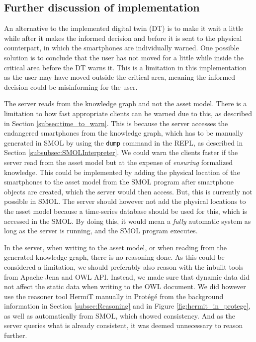 \documentclass{article}
\begin{document}
\subsection{Further discussion of implementation}
An alternative to the implemented digital twin (DT) is to make it wait a little while after it makes the informed decision and before it is sent to the physical counterpart, in which the smartphones are individually warned. One possible solution is to conclude that the user has not moved for a little while inside the critical area before the DT warns it. This is a limitation in this implementation as the user may have moved outside the critical area, meaning the informed decision could be misinforming for the user.

The server reads from the knowledge graph and not the asset model.
There is a limitation to how fast appropriate clients can be warned due to this, as described in Section \ref{subsec:time_to_warn}. This is because the server accesses the endangered smartphones from the knowledge graph, which has to be manually generated in SMOL by using the \verb|dump| command in the REPL, as described in Section \ref{subsubsec:SMOLInterpreter}. We could warn the clients faster if the server read from the asset model but at the expense of \emph{ensuring} formalized knowledge. This could be implemented by adding the physical location of the smartphones to the asset model from the SMOL program after smartphone objects are created, which the server would then access. But, this is currently not possible in SMOL. The server should however not add the physical locations to the asset model because a time-series database should be used for this, which is accessed in the SMOL. By doing this, it would mean a \emph{fully} automatic system as long as the server is running, and the SMOL program executes.

In the server, when writing to the asset model, or when reading from the generated knowledge graph, there is no reasoning done. As this could be considered a limitation, we should preferably also reason with the inbuilt tools from Apache Jena and OWL API. Instead, we made sure that dynamic data did not affect the static data when writing to the OWL document. We did however use the reasoner tool HermiT manually in Protégé from the background information in Section \ref{subsec:Reasoning} and in Figure \ref{fig:hermit_in_protege}, as well as automatically from SMOL, which showed consistency. And as the server queries what is already consistent, it was deemed unnecessary to reason further.
\end{document}
